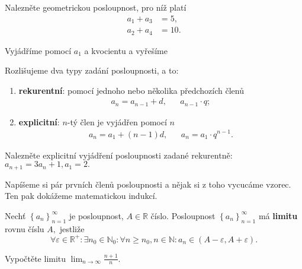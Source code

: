 \begin{priklad}
Nalezněte geometrickou posloupnost, pro níž platí
\begin{align*}
    a_1+a_3 &=5,\\
    a_2+a_4 &= 10.
\end{align*}
\end{priklad}

\begin{reseni}
Vyjádříme pomocí $a_1$ a kvocientu a vyřešíme
\end{reseni}

\begin{pozn}
    Rozlišujeme dva typy zadání posloupnosti, a to:
    \begin{enumerate}[$i.$]
    \item \textbf{rekurentní}: pomocí jednoho nebo několika předchozích členů
    \begin{align*}
        a_n=a_{n-1}+d, & & a_{n-1}\cdot q;
    \end{align*}
   	\item \textbf{explicitní}: $n$-tý člen je vyjádřen pomocí $n$
    \begin{align*}
        a_n=a_1+(n-1)d, & & a_n = a_1\cdot q^{n-1}.
    \end{align*}
    \end{enumerate}
\end{pozn}

\begin{priklad}
Nalezněte explicitní vyjádření posloupnosti zadané rekurentně: $a_{n+1}=3a_n+1,a_1=2.$
\end{priklad}

\begin{reseni}
Napíšeme si pár prvních členů posloupnosti a nějak si z toho vycucáme vzorec. Ten
pak dokážeme matematickou indukcí.
\end{reseni}

\begin{definition}
Nechť $\left \{ a_n \right \}_{n=1}^\infty $ je posloupnost, $A\in \mathbb R$ číslo.
Posloupnost $\left \{ a_n \right \}_{n=1}^\infty $ má \textbf{limitu} rovnu číslu
$A,$ jestliže
$$\forall \varepsilon \in \mathbb R^+: \exists n_0 \in \mathbb N_0: \forall n \geq n_0,n \in \mathbb N: a_n\in(A-\varepsilon, A+\varepsilon).$$
\end{definition}

\begin{priklad}
Vypočtěte limitu $\lim_{n\to\infty}\frac{n+1}{n}.$
\end{priklad}

